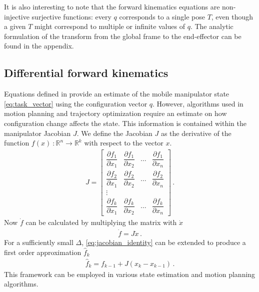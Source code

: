 \documentclass[times, utf8, diplomski, english]{fer}
\begin{document}
It is also interesting to note that the forward kinematics equations are non-injective surjective functions: 
every $q$ corresponds to a single pose $T$, even though a given $T$ might correspond to multiple or infinite values of $q$.
The analytic formulation of the transform from the global frame to the end-effector can be found in the appendix.

\subsection{Differential forward kinematics}
Equations defined in  provide an estimate of the mobile manipulator state \eqref{eq:task_vector} using the configuration vector $q$. 
However, algorithms used in motion planning and trajectory optimization require an estimate on how configuration change affects the state.
This information is contained within the manipulator Jacobian $J$.
We define the Jacobian $J$ as the derivative of the function $f\left(x\right) \ : \mathbb{R}^n \rightarrow \mathbb{R}^k $ with respect to the vector $x$.
\begin{align}\label{eq:jacobian}
J =
\begin{bmatrix}
    \dfrac{\partial {f_1}}{\partial x_{1}}      & \dfrac{\partial {f}_{1}}{\partial x_{2}}  & \dots & \dfrac{\partial {f}_{1}}{\partial x_{n}}  \\
    \dfrac{\partial{f_2}}{\partial x_{1}}      & \dfrac{\partial {f}_{2}}{\partial x_{2}}  & \dots & \dfrac{\partial {f}_{2}}{\partial x_{n}} \\
    \vdots \\
    \dfrac{\partial {f_k}}{\partial x_{1}}      & \dfrac{\partial {f}_{k}}{\partial x_{2}}  & \dots & \dfrac{\partial {f}_{k}}{\partial x_{n}}
\end{bmatrix}\, .
\end{align}
Now $\dot{f}$ can be calculated by multiplying the matrix with $\dot{x}$
\begin{align} \label{eq:jacobian_identity}
\dot{f} = J \dot{x}\, .
\end{align}
For a sufficiently small $\Delta$, \eqref{eq:jacobian_identity} can be extended to produce a first order approximation $\hat{f}_k$ 
\begin{align} \label{eq:jacobian_estimate}
\hat{f}_k = f_{k-1} + J\left(x_{k} - x_{k-1}\right)\, .
\end{align}
This framework can be employed in various state estimation and motion planning algorithms.
\newpage
\end{document}
